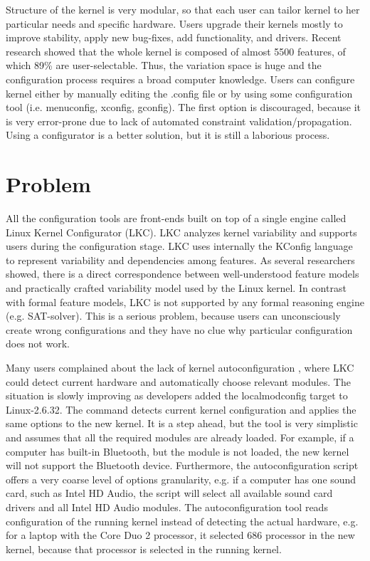 \documentclass{chi2009}
\begin{document}

Structure of the kernel is very modular, so that each user can tailor kernel to her particular needs and specific hardware. Users upgrade their kernels mostly to improve stability, apply new bug-fixes, add functionality, and drivers. Recent research \cite{she:kernel:2010} showed that the whole kernel is composed of almost 5500 features, of which 89\% are user-selectable. Thus, the variation space is huge and the configuration process requires a broad computer knowledge. Users can configure kernel either by manually editing the \textsf{.config} file or by using some configuration tool (i.e. \textsf{menuconfig, xconfig, gconfig}). The first option is discouraged, because it is very error-prone due to lack of automated constraint validation/propagation. Using a configurator is a better solution, but it is still a laborious process.

\section{Problem}
All the configuration tools are front-ends built on top of a single engine called Linux Kernel Configurator (LKC). LKC analyzes kernel variability and supports users during the configuration stage. LKC uses internally the KConfig language to represent variability and dependencies among features. As several researchers \cite{sincero:lkc:2008,she:kernel:2010} showed, there is a direct correspondence between well-understood feature models and practically crafted variability model used by the Linux kernel. In contrast with formal feature models, LKC is not supported by any formal reasoning engine (e.g. SAT-solver). This is a serious problem, because users can unconsciously create wrong configurations and they have no clue why particular configuration does not work.

Many users complained about the lack of kernel autoconfiguration \cite{debian:config:2010,soft32:config:2007}, where LKC could detect current hardware and automatically choose relevant modules. The situation is slowly improving as developers added the \textsf{localmodconfig} target to Linux-2.6.32. The command detects current kernel configuration and applies the same options to the new kernel. It is a step ahead, but the tool is very simplistic and assumes that all the required modules are already loaded. For example, if a computer has built-in Bluetooth, but the module is not loaded, the new kernel will not support the Bluetooth device. Furthermore, the autoconfiguration script offers a very coarse level of options granularity, e.g. if a computer has one sound card, such as Intel HD Audio, the script will select all available sound card drivers and all Intel HD Audio modules. The autoconfiguration tool reads configuration of the running kernel instead of detecting the actual hardware, e.g. for a laptop with the Core Duo 2 processor, it selected 686 processor in the new kernel, because that processor is selected in the running kernel.
\end{document}
